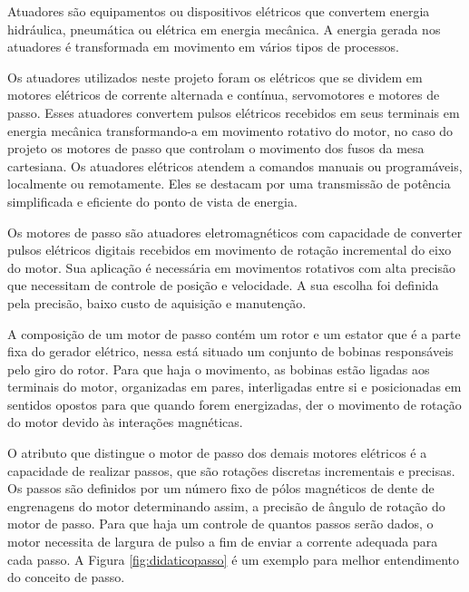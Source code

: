 Atuadores são equipamentos ou dispositivos elétricos que convertem energia hidráulica, pneumática 
ou elétrica em energia mecânica. A energia gerada nos atuadores é transformada em movimento em 
vários tipos de processos.

Os atuadores utilizados neste projeto foram os elétricos que se dividem em  motores elétricos de 
corrente alternada e contínua, servomotores e motores de passo. Esses atuadores convertem pulsos 
elétricos recebidos em seus terminais em energia mecânica transformando-a em movimento rotativo 
do motor, no caso do projeto os motores de passo que controlam o movimento dos fusos da mesa 
cartesiana. Os atuadores elétricos atendem a comandos manuais ou programáveis, localmente ou remotamente. 
Eles se destacam por uma transmissão de potência simplificada e eficiente do ponto de vista de energia.

Os motores de passo são atuadores eletromagnéticos com capacidade de converter pulsos elétricos digitais 
recebidos em movimento de rotação incremental do eixo do motor. Sua aplicação é necessária em movimentos 
rotativos com alta precisão que necessitam de controle de posição e velocidade. A sua escolha foi definida 
pela precisão, baixo custo de aquisição e manutenção.

A composição de um motor de passo contém um rotor e um estator que é a parte fixa do gerador elétrico, nessa está 
situado um conjunto de bobinas responsáveis pelo giro do rotor. Para que haja o movimento, as bobinas estão ligadas 
aos terminais do motor, organizadas em pares, interligadas entre si e posicionadas em sentidos opostos para que 
quando forem energizadas, der o movimento de rotação do motor devido às interações magnéticas.

O atributo que distingue o motor de passo dos demais motores elétricos é a capacidade de realizar passos, que são 
rotações discretas incrementais e precisas. Os passos são definidos por um número fixo de pólos magnéticos de dente 
de engrenagens do motor determinando assim, a precisão de ângulo de rotação do motor de passo. Para que haja um 
controle de quantos passos serão dados, o motor necessita de largura de pulso a fim de enviar a corrente adequada 
para cada passo. A Figura \ref{fig:didaticopasso} é um exemplo para melhor entendimento do conceito de passo.

